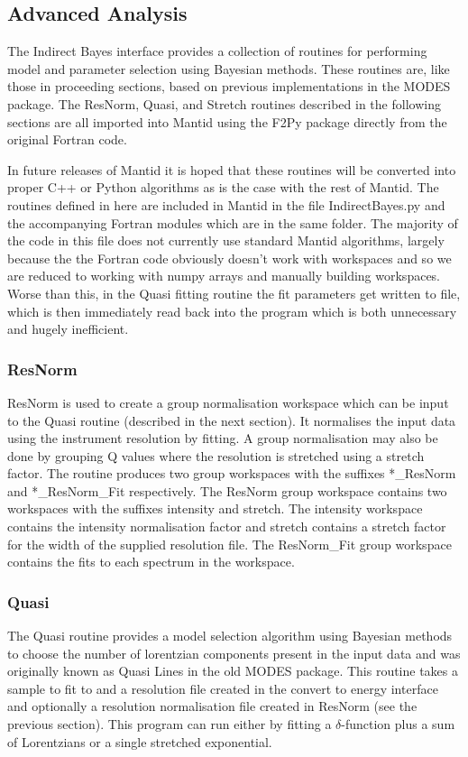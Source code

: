 \documentclass[paper=a4, fontsize=11pt]{scrartcl}	%
\numberwithin{equation}{section}															%
\numberwithin{figure}{section}																%
\numberwithin{table}{section}																%
\begin{document}
\subsection{Advanced Analysis}

The Indirect Bayes interface provides a collection of routines for performing model and parameter selection using Bayesian methods. These routines are, like those in proceeding sections, based on previous implementations in the MODES package. The ResNorm, Quasi, and Stretch routines described in the following sections are all imported into Mantid using the F2Py package directly from the original Fortran code. 

In future releases of Mantid it is hoped that these routines will be converted into proper C++ or Python algorithms as is the case with the rest of Mantid. The routines defined in here are included in Mantid in the file IndirectBayes.py and the accompanying Fortran modules which are in the same folder. The majority of the code in this file does not currently use standard Mantid algorithms, largely because the the Fortran code obviously doesn't work with workspaces and so we are reduced to working with numpy arrays and manually building workspaces. Worse than this, in the Quasi fitting routine the fit parameters get written to file, which is then immediately read back into the program which is both unnecessary and hugely inefficient.

\subsubsection{ResNorm}
ResNorm is used to create a group normalisation workspace which can be input to the Quasi routine (described in the next section). It normalises the input data using the instrument resolution by fitting. A group normalisation may also be done by grouping Q values where the resolution is stretched using a stretch factor. The routine produces two group workspaces with the suffixes \**\_ResNorm and \**\_ResNorm\_Fit respectively. The ResNorm group workspace contains two workspaces with the suffixes intensity and stretch. The intensity workspace contains the intensity normalisation factor and stretch contains a stretch factor for the width of the supplied resolution file. The ResNorm\_Fit group workspace contains the fits to each spectrum in the workspace.

\subsubsection{Quasi}
The Quasi routine provides a model selection algorithm using Bayesian methods to choose the number of lorentzian components present in the input data \cite{dssivia1992} and was originally known as Quasi Lines in the old MODES package. This routine takes a sample to fit to and a resolution file created in the convert to energy interface and optionally a resolution normalisation file created in ResNorm (see the previous section). This program can run either by fitting a $\delta$-function plus a sum of Lorentzians or a single stretched exponential.
\end{document}
